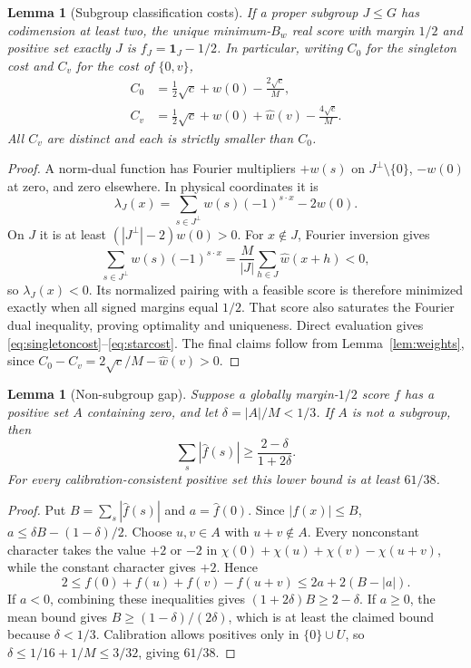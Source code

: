 \documentclass[11pt]{article}
\newtheorem{lemma}[theorem]{Lemma}
\newcommand{\one}{\mathbf 1}
\begin{document}
\begin{lemma}[Subgroup classification costs]\label{lem:subgroup}
If a proper subgroup $J\le G$ has codimension at least two, the unique
minimum-$B_w$ real score with margin $1/2$ and positive set exactly $J$
is $f_J=\one_J-1/2$. In particular, writing $C_0$ for the singleton
cost and $C_v$ for the cost of $\{0,v\}$,
\begin{align}
 C_0&=\frac12\sqrt c+\widehat w(0)-\frac{2\sqrt c}M,\label{eq:singletoncost}\\
 C_v&=\frac12\sqrt c+\widehat w(0)+\widehat w(v)-\frac{4\sqrt c}M.
 \label{eq:starcost}
\end{align}
All $C_v$ are distinct and each is strictly smaller than $C_0$.
\end{lemma}
\begin{proof}
A norm-dual function has Fourier multipliers $+w(s)$ on
$J^\perp\setminus\{0\}$, $-w(0)$ at zero, and zero elsewhere. In
physical coordinates it is
\[
 \lambda_J(x)=\sum_{s\in J^\perp}w(s)(-1)^{s\cdot x}-2w(0).
\]
On $J$ it is at least $(|J^\perp|-2)w(0)>0$. For $x\notin J$,
Fourier inversion gives
\[
 \sum_{s\in J^\perp}w(s)(-1)^{s\cdot x}
   =\frac M{|J|}\sum_{h\in J}\widehat w(x+h)<0,
\]
so $\lambda_J(x)<0$. Its normalized pairing with a feasible score is
therefore minimized exactly when all signed margins equal $1/2$.
That score also saturates the Fourier dual inequality, proving
optimality and uniqueness. Direct evaluation gives
\eqref{eq:singletoncost}--\eqref{eq:starcost}. The final claims follow
from Lemma~\ref{lem:weights}, since
$C_0-C_v=2\sqrt c/M-\widehat w(v)>0$.
\end{proof}

\begin{lemma}[Non-subgroup gap]\label{lem:nonsubgroup}
Suppose a globally margin-$1/2$ score $f$ has a positive set $A$
containing zero, and let $\delta=|A|/M<1/3$. If $A$ is not a subgroup,
then
\[
 \sum_s|\widehat f(s)|\ge\frac{2-\delta}{1+2\delta}.
\]
For every calibration-consistent positive set this lower bound is at
least $61/38$.
\end{lemma}
\begin{proof}
Put $B=\sum_s|\widehat f(s)|$ and $a=\widehat f(0)$. Since
$|f(x)|\le B$,
$a\le\delta B-(1-\delta)/2$. Choose $u,v\in A$ with $u+v\notin A$.
Every nonconstant character takes the value $+2$ or $-2$ in
$\chi(0)+\chi(u)+\chi(v)-\chi(u+v)$, while the constant character
gives $+2$. Hence
\[
 2\le f(0)+f(u)+f(v)-f(u+v)
   \le2a+2(B-|a|).
\]
If $a<0$, combining these inequalities gives
$(1+2\delta)B\ge2-\delta$. If $a\ge0$, the mean bound gives
$B\ge(1-\delta)/(2\delta)$, which is at least the claimed bound
because $\delta<1/3$. Calibration allows positives only in
$\{0\}\cup U$, so $\delta\le1/16+1/M\le3/32$, giving $61/38$.
\end{proof}
\end{document}
